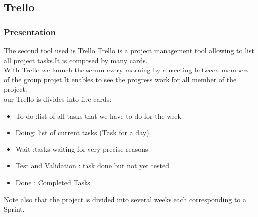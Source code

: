 \subsection{Trello}
\subsubsection{Presentation}
The second tool used is Trello
Trello  is a project management tool allowing to list all project tasks.It is composed by many cards.
\\ With Trello we launch the scrum  every morning by a meeting between members of the group projet.It enables to see the progress work for all member  of the project.
\\our Trello is divides  into five cards:
\begin{itemize}
\item To do :list of all tasks that we have to do for  the week
\item Doing: list of current  tasks (Task  for a day)
\item Wait :tasks  waiting for very precise reasons
\item Test and Validation : task done but not yet tested
\item Done : Completed Tasks 
\end{itemize}
Note also that the project is divided into several weeks each corresponding to a Sprint.
